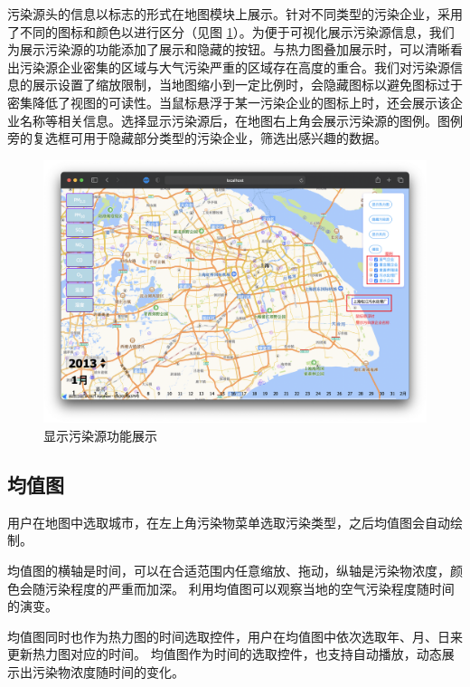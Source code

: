 \documentclass[UTF8]{ctexrep}
\begin{document}
    污染源头的信息以标志的形式在地图模块上展示。针对不同类型的污染企业，采用了不同的图标和颜色以进行区分（见图 \ref{fig:pollution_source_demo1}）。为便于可视化展示污染源信息，我们为展示污染源的功能添加了展示和隐藏的按钮。与热力图叠加展示时，可以清晰看出污染源企业密集的区域与大气污染严重的区域存在高度的重合。我们对污染源信息的展示设置了缩放限制，当地图缩小到一定比例时，会隐藏图标以避免图标过于密集降低了视图的可读性。当鼠标悬浮于某一污染企业的图标上时，还会展示该企业名称等相关信息。选择显示污染源后，在地图右上角会展示污染源的图例。图例旁的复选框可用于隐藏部分类型的污染企业，筛选出感兴趣的数据。\\

    \begin{figure}[h!]
        \centering
        \includegraphics[width=15cm,keepaspectratio]{images/pollution_source_demo1.png}
        \caption{显示污染源功能展示}
        \label{fig:pollution_source_demo1}
    \end{figure}

    \subsection{均值图}
    用户在地图中选取城市，在左上角污染物菜单选取污染类型，之后均值图会自动绘制。
    \par
    均值图的横轴是时间，可以在合适范围内任意缩放、拖动，纵轴是污染物浓度，颜色会随污染程度的严重而加深。
    利用均值图可以观察当地的空气污染程度随时间的演变。
    \par
    均值图同时也作为热力图的时间选取控件，用户在均值图中依次选取年、月、日来更新热力图对应的时间。
    均值图作为时间的选取控件，也支持自动播放，动态展示出污染物浓度随时间的变化。
    \par
\end{document}
